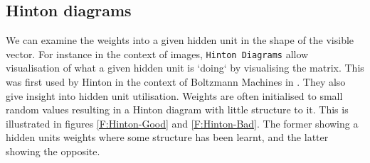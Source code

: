 \subsection{Hinton diagrams}
  We can examine the weights into a given hidden unit in the shape of the visible vector. For instance in the context of images, \texttt{Hinton Diagrams} allow visualisation of what a given hidden unit is `doing` by visualising the matrix. This was first used by Hinton in the context of Boltzmann Machines in \cite{Hinton:1986:LRB:104279.104291}. They also give insight into hidden unit utilisation. Weights are often initialised to small random values resulting in a Hinton diagram with little structure to it. This is illustrated in figures \ref{F:Hinton-Good} and \ref{F:Hinton-Bad}. The former showing a hidden units weights where some structure has been learnt, and the latter showing the opposite.

